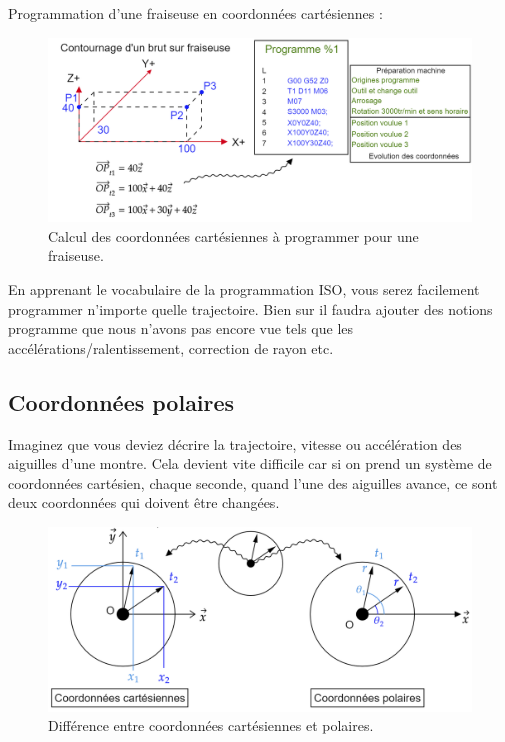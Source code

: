 \documentclass[
	11pt, %
	fleqn, %
	a4paper, %
]{LegrandOrangeBook}
\begin{document}
Programmation d'une fraiseuse en coordonnées cartésiennes :



\begin{figure}[H] %
	\centering %
	\includegraphics[width=1\textwidth]{Images/cart3.png} %
	\caption{Calcul des coordonnées cartésiennes à programmer pour une fraiseuse.}
	\label{cart3} %
\end{figure}

En apprenant le vocabulaire de la programmation ISO, vous serez facilement programmer n'importe quelle trajectoire. Bien sur il faudra ajouter des notions programme que nous n'avons pas encore vue tels que les accélérations/ralentissement, correction de rayon etc.


\subsection{Coordonnées polaires}
Imaginez que vous deviez décrire la trajectoire,  vitesse ou accélération des aiguilles d'une montre. Cela devient vite difficile car si on prend un système de coordonnées cartésien, chaque seconde, quand l'une des aiguilles avance, ce sont deux coordonnées qui doivent être changées. 

\begin{figure}[H] %
	\centering %
	\includegraphics[width=1\textwidth]{Images/pol1.png} %
	\caption{Différence entre coordonnées cartésiennes et polaires.}
	\label{pol1} %
\end{figure}
\end{document}
